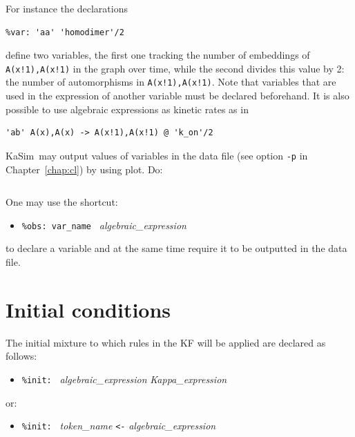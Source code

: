 \documentclass[11pt]{book}
\def\KaSim{\textsf{KaSim}}
\def\ttt#1{\texttt{#1}}
\def\noi{\noindent}
\def\ITE#1{\begin{itemize}#1\end{itemize}}
\begin{document}
\noi For instance the declarations
\begin{lstlisting}[language=kappa]
%var: 'homodimer' |A(x!1),A(x!1)|
%var: 'aa' 'homodimer'/2
\end{lstlisting}
define two variables, the first one tracking the number of embeddings of \ttt{A(x!1),A(x!1)} in the graph over time, while the second divides this value by 2: the number of automorphisms in \ttt{A(x!1),A(x!1)}. Note that variables that are used in the expression of another variable must be declared beforehand.
\vskip 0.25cm
\noi It is also possible to use algebraic expressions as kinetic rates as in
\begin{lstlisting}[language=kappa]
%var: 'k_on' 1.0E-6 # per molecule per second
'ab' A(x),A(x) -> A(x!1),A(x!1) @ 'k_on'/2
\end{lstlisting}
\KaSim~may output values of variables in the data file (see option \ttt{-p} in Chapter~\ref{chap:cl}) by using plot. Do:
\begin{lstlisting}[language=kappa]
%plot: 'var_name'
\end{lstlisting}
One may use the shortcut:
\ITE{
\item[] \ttt{\%obs: {\textquotesingle}var\_name{\textquotesingle} } \textit{algebraic\_expression}}
to declare a variable and at the same time require it to be outputted in the data file.

\section{Initial conditions}\label{sec:init}

The initial mixture to which rules in the KF will be applied are declared as follows:
\ITE{
\item[] \ttt{\%init: } \textit{algebraic\_expression} \textit{Kappa\_expression}
}
or:
\ITE{
\item[] \ttt{\%init: }  \textit{token\_name} \ttt{<-} \textit{algebraic\_expression}
}
\end{document}

